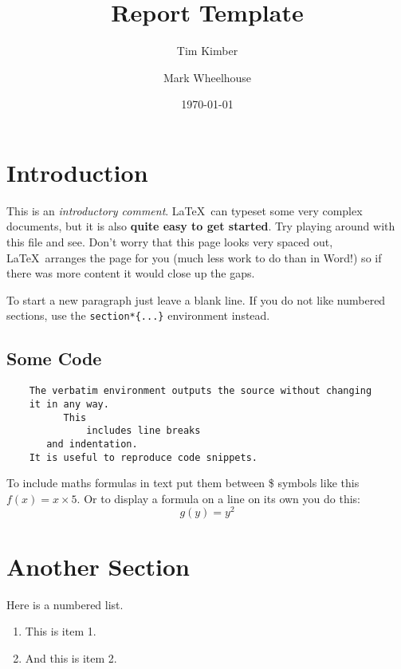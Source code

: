 \documentclass[a4wide, 11pt]{article}
\begin{document}
\title{Report Template}

\author{Tim Kimber \and Mark Wheelhouse}

\date{\today}         %

\maketitle            %

\section{Introduction}

This is an \emph{introductory comment}.
\LaTeX\ can typeset some very complex documents, but it is also
\textbf{quite easy to get started}.
Try playing around with this file and see. 
Don't worry that this page looks very spaced out,
\LaTeX\ arranges the page for you (much less work to do than in Word!)
so if there was more content it would close up the gaps.

To start a new paragraph just leave a blank line.
If you do not like numbered sections, use the \texttt{section*\{...\}}
environment instead.

\subsection{Some Code} 

\begin{verbatim}
    The verbatim environment outputs the source without changing
    it in any way. 
          This
              includes line breaks
       and indentation. 
    It is useful to reproduce code snippets.
\end{verbatim}

To include maths formulas in text put them between \$ symbols like this
$f(x) = x \times 5$.
Or to display a formula on a line on its own you do this:
\[
    g(y) = y^2
\]

\section{Another Section}

Here is a numbered list.

\begin{enumerate}

    \item
    This is item 1.
    
    \item
    And this is item 2.
    
\end{enumerate}
\end{document}
